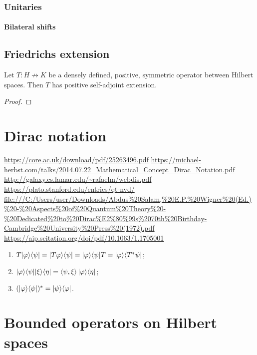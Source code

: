 \subsubsection{Unitaries}
\paragraph{Bilateral shifts}

\subsection{Friedrichs extension}
\begin{proposition}
Let $T: H\not\to K$ be a densely defined, positive, symmetric operator between Hilbert spaces. Then $T$ has positive self-adjoint extension.
\end{proposition}
\begin{proof}

\end{proof}


\section{Dirac notation}
\url{https://core.ac.uk/download/pdf/25263496.pdf}
\url{https://michael-herbst.com/talks/2014.07.22_Mathematical_Concept_Dirac_Notation.pdf}
\url{http://galaxy.cs.lamar.edu/~rafaelm/webdis.pdf}
\url{https://plato.stanford.edu/entries/qt-nvd/}
\url{file:///C:/Users/user/Downloads/Abdus%20Salam,%20E.P.%20Wigner%20(Ed.)%20-%20Aspects%20of%20Quantum%20Theory%20-%20Dedicated%20to%20Dirac%E2%80%99s%2070th%20Birthday-Cambridge%20University%20Press%20(1972).pdf}
\url{https://aip.scitation.org/doi/pdf/10.1063/1.1705001}

\begin{lemma}
\begin{enumerate}
\item $T|\varphi\rangle\langle\psi| = |T\varphi\rangle\langle\psi| = |\varphi\rangle\langle\psi|T = |\varphi\rangle\langle T^*\psi|$;
\item $|\varphi\rangle\langle\psi||\xi\rangle\langle\eta| = \left\langle \psi, \xi \right\rangle|\varphi\rangle\langle\eta|$;
\item $(|\varphi\rangle\langle\psi|)^* = |\psi\rangle\langle\varphi|$.
\end{enumerate}
\end{lemma}

\section{Bounded operators on Hilbert spaces}

